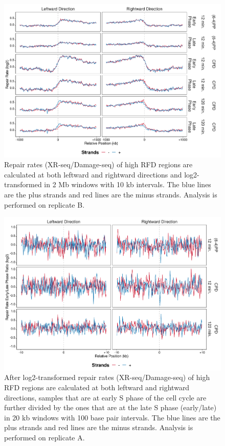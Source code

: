 \begin{figure}[H]
\begin{center}
\includegraphics[width=\textwidth]{Chapters/7_appendix/figures/supfig67}
\caption[Repair rate of high RFDs in 2 Mb (replicate B).]{Repair rates (XR-seq/Damage-seq) of high RFD regions are calculated at both leftward and rightward directions and log2-transformed in 2 Mb windows with 10 kb intervals. The blue lines are the plus strands and red lines are the minus strands. Analysis is performed on replicate B.}
\label{supfig:rr2000rfdB}
\end{center}
\end{figure}

\begin{figure}[H]
\begin{center}
\includegraphics[width=\textwidth]{Chapters/7_appendix/figures/supfig68}
\caption[Repair rate early/late ratio of high RFDs in 20 kb (replicate A).]{After log2-transformed repair rates (XR-seq/Damage-seq) of high RFD regions are calculated at both leftward and rightward directions, samples that are at early S phase of the cell cycle are further divided by the ones that are at the late S phase (early/late) in 20 kb windows with 100 base pair intervals. The blue lines are the plus strands and red lines are the minus strands. Analysis is performed on replicate A.}
\label{supfig:rrel20rfdA}
\end{center}
\end{figure}

